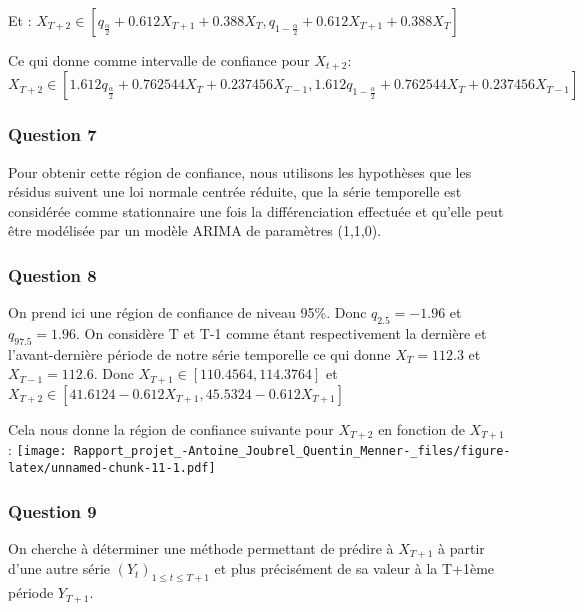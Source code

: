 \documentclass[
  landscape]{article}
\begin{document}
Et :
\(X_{T+2} \in \left[q_{\frac{\alpha}{2}} + 0.612X_{T+1} + 0.388X_{T}, q_{1-\frac{\alpha}{2}} + 0.612X_{T+1} + 0.388X_{T}\right]\)

Ce qui donne comme intervalle de confiance pour \(X_{t+2}\):
\(X_{T+2} \in \left[1.612q_{\frac{\alpha}{2}} + 0.762544X_{T} + 0.237456X_{T-1}, 1.612q_{1-\frac{\alpha}{2}} + 0.762544X_{T} + 0.237456X_{T-1}\right]\)

\hypertarget{question-7}{%
\subsubsection{Question 7}\label{question-7}}

Pour obtenir cette région de confiance, nous utilisons les hypothèses
que les résidus suivent une loi normale centrée réduite, que la série
temporelle est considérée comme stationnaire une fois la différenciation
effectuée et qu'elle peut être modélisée par un modèle ARIMA de
paramètres (1,1,0).

\hypertarget{question-8}{%
\subsubsection{Question 8}\label{question-8}}

On prend ici une région de confiance de niveau 95\%. Donc
\(q_{2.5}=-1.96\) et \(q_{97.5}=1.96\). On considère T et T-1 comme
étant respectivement la dernière et l'avant-dernière période de notre
série temporelle ce qui donne \(X_{T}=112.3\) et \(X_{T-1}=112.6\). Donc
\(X_{T+1} \in \left[110.4564,114.3764\right]\) et
\(X_{T+2} \in \left[41.6124 - 0.612X_{T+1},45.5324 - 0.612X_{T+1}\right]\)

Cela nous donne la région de confiance suivante pour \(X_{T+2}\) en
fonction de \(X_{T+1}\) :
\texttt{[image: Rapport\_projet\_-Antoine\_Joubrel\_Quentin\_Menner-\_files/figure-latex/unnamed-chunk-11-1.pdf]}

\hypertarget{question-9}{%
\subsubsection{Question 9}\label{question-9}}

On cherche à déterminer une méthode permettant de prédire à \(X_{T+1}\)
à partir d'une autre série \((Y_{t})_{1 \leq t \leq T+1}\) et plus
précisément de sa valeur à la T+1ème période \(Y_{T+1}\).
\end{document}
